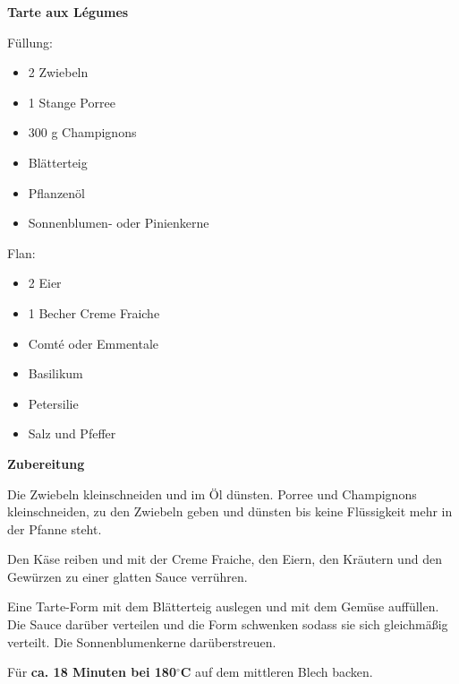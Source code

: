 

\parindent0pt	

\pagestyle{empty}


\textbf{{\LARGE Tarte aux Légumes}}%

\hrulefill


\vspace*{\fill}
\begin{multicols}{2}	

Füllung:
\begin{itemize}
\item 2 Zwiebeln
\item 1 Stange Porree
\item 300 g Champignons
\item Blätterteig
\item Pflanzenöl
\item Sonnenblumen- oder Pinienkerne
\end{itemize}
Flan:
\begin{itemize}
\item 2 Eier
\item 1 Becher Creme Fraiche
\item Comté oder Emmentale
\item Basilikum
\item Petersilie
\item Salz und Pfeffer
\end{itemize}
\end{multicols}
\vfill									%

\vspace{1cm}
%
%

\vfill
\newpage
\textbf{{\LARGE Zubereitung}}%

\hrulefill

\vspace*{\fill}
\begin{multicols}{2}

Die Zwiebeln kleinschneiden und im Öl dünsten. Porree und Champignons kleinschneiden, zu den Zwiebeln geben und dünsten bis keine Flüssigkeit mehr in der Pfanne steht.\newline

Den Käse reiben und mit der Creme Fraiche, den Eiern, den Kräutern und den Gewürzen zu einer glatten Sauce verrühren.\newline

Eine Tarte-Form mit dem Blätterteig auslegen und mit dem Gemüse auffüllen. Die Sauce darüber verteilen und die Form
schwenken sodass sie sich gleichmäßig verteilt.\newline
Die Sonnenblumenkerne darüberstreuen.\newline

Für \textbf{ca. 18 Minuten bei 180$^{\circ}$C} auf dem mittleren Blech backen.
\end{multicols}
\vfill
